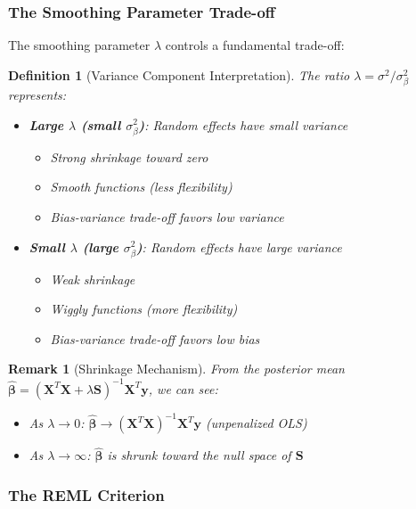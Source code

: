 \documentclass[12pt]{article}
\newtheorem{definition}{Definition}
\newtheorem{remark}{Remark}
\begin{document}
\subsubsection{The Smoothing Parameter Trade-off}

The smoothing parameter $\lambda$ controls a fundamental trade-off:

\begin{definition}[Variance Component Interpretation]
The ratio $\lambda = \sigma^2/\sigma^2_{\beta}$ represents:
\begin{itemize}
    \item \textbf{Large $\lambda$ (small $\sigma^2_{\beta}$)}: Random effects have small variance
    \begin{itemize}
        \item Strong shrinkage toward zero
        \item Smooth functions (less flexibility)
        \item Bias-variance trade-off favors low variance
    \end{itemize}
    \item \textbf{Small $\lambda$ (large $\sigma^2_{\beta}$)}: Random effects have large variance
    \begin{itemize}
        \item Weak shrinkage
        \item Wiggly functions (more flexibility)
        \item Bias-variance trade-off favors low bias
    \end{itemize}
\end{itemize}
\end{definition}

\begin{remark}[Shrinkage Mechanism]
From the posterior mean $\hat{\bm{\beta}} = (\mathbf{X}^T\mathbf{X} + \lambda\mathbf{S})^{-1}\mathbf{X}^T\mathbf{y}$, we can see:
\begin{itemize}
    \item As $\lambda \to 0$: $\hat{\bm{\beta}} \to (\mathbf{X}^T\mathbf{X})^{-1}\mathbf{X}^T\mathbf{y}$ (unpenalized OLS)
    \item As $\lambda \to \infty$: $\hat{\bm{\beta}}$ is shrunk toward the null space of $\mathbf{S}$
\end{itemize}
\end{remark}

\subsubsection{The REML Criterion}
\end{document}
